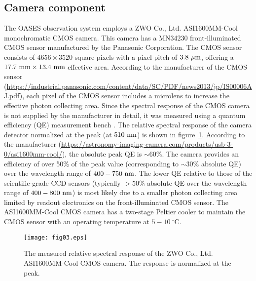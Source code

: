 \documentclass{pasj01}
\newcommand{\void}[1]{}
\renewcommand{\textcolor}{\void}
\begin{document}
\subsection{Camera component}

The OASES observation system 
employs a ZWO Co., Ltd. ASI1600MM-Cool monochromatic CMOS camera.
This camera has a MN34230 
front-illuminated CMOS sensor manufactured by the Panasonic Corporation.
The CMOS sensor consists of $4656 \times 3520$ square pixels 
with a pixel pitch of $3.8 \ {\rm \mu m}$, 
offering a $17.7 \ {\rm mm} \times 13.4 \ {\rm mm}$ effective area.
\textcolor{red}{
According to the manufacturer of the CMOS sensor
(\url{https://industrial.panasonic.com/content/data/SC/PDF/news2013/jp/IS00006AJ.pdf}), 
each pixel of the CMOS sensor 
includes a microlens to increase the effective photon collecting area.
}
Since the spectral response of the CMOS camera 
is not supplied by the manufacturer in detail, 
it was measured 
using a quantum efficiency (QE) measurement bench \citep{kamata04}.
The relative spectral response of 
the camera detector normalized at the peak (at $510 \ {\rm nm}$) 
is shown in figure~\ref{fig32}.
According to the manufacturer 
(\url{https://astronomy-imaging-camera.com/products/usb-3-0/asi1600mm-cool/}),
the absolute peak QE is $\sim 60\%$.
The camera provides an efficiency of over 50\% of the peak value
(corresponding to $\sim 30\%$ absolute QE) 
over the wavelength range of  $400-750 \ {\rm nm}$.
\textcolor{red}{
The lower QE relative to those of the scientific-grade CCD sensors 
(typically $> 50\%$ absolute QE over the wavelength range of  $400-800 \ {\rm nm}$) 
is most likely due to a smaller photon collecting area 
limited by readout electronics on the front-illuminated CMOS sensor.
}
The ASI1600MM-Cool CMOS camera 
has a two-stage Peltier cooler 
to maintain the CMOS sensor with an operating temperature 
at $5-10 \ {}^\circ\mathrm{C}$.

\begin{figure}[!t]
\begin{center}
   \texttt{[image: fig03.eps]}
   \caption{The measured relative spectral response of the ZWO Co., Ltd. ASI1600MM-Cool CMOS camera.
   The response is normalized at the peak.}
   \label{fig32}
 \end{center}
\end{figure}
\end{document}
